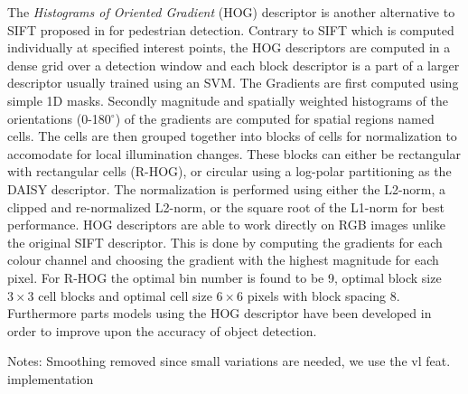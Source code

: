 \documentclass[thesis.tex]{subfiles}
\begin{document}
The \emph{Histograms of Oriented Gradient} (HOG) descriptor is another
alternative to SIFT proposed in \cite{dalal2005histograms} for pedestrian
detection. Contrary to SIFT which is computed individually at specified
interest points, the HOG descriptors are computed in a dense grid over a
detection window and each block descriptor is a part of a larger descriptor
usually trained using an SVM. The Gradients are first computed using simple
1D masks. Secondly magnitude and spatially weighted histograms of the
orientations (0-180$^{\circ}$) of the gradients are computed for spatial
regions named cells. The cells are
then grouped together into blocks of cells for normalization to accomodate
for local illumination changes. These blocks can either be rectangular with
rectangular cells (R-HOG), or circular using a log-polar partitioning as the
DAISY descriptor. The normalization is performed using either the L2-norm,
a clipped and re-normalized L2-norm, or the square root of the L1-norm for
best performance. HOG descriptors are able to work directly on RGB images
unlike the original SIFT descriptor. This is done by computing the gradients
for each colour channel and choosing the gradient with the highest magnitude
for each pixel. For R-HOG the optimal bin number is found to be 9, optimal
block size $3\times3$ cell blocks and optimal cell size $6\times6$ pixels
with block spacing 8.
Furthermore parts models using the HOG descriptor have been developed
\cite{felzenszwalb2008discriminatively} in order to improve upon the accuracy
of object detection.

Notes: Smoothing removed since small variations are needed, we use the vl feat. implementation


%
%
%
%
%
%
%
%
%

\subbibliography
\end{document}

